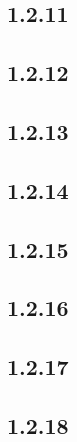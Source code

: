\documentclass[11pt]{article}
\begin{document}
	\subsection*{1.2.11}
	\subsection*{1.2.12}
	\subsection*{1.2.13}
	\subsection*{1.2.14}
	\subsection*{1.2.15}
	\subsection*{1.2.16}
	\subsection*{1.2.17}
	\subsection*{1.2.18}


		
\end{document}

